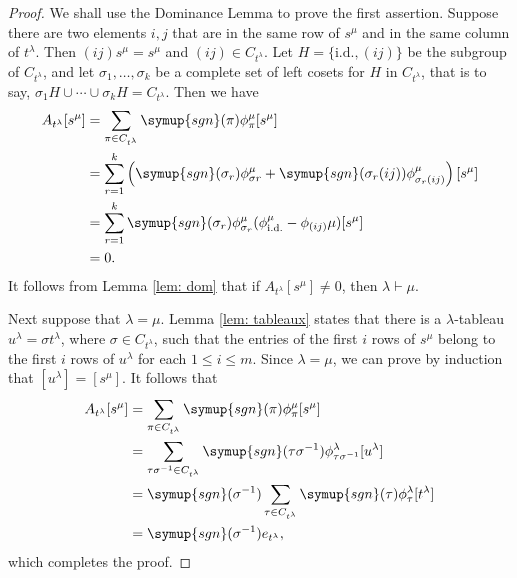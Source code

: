 \documentclass{assignment}[2019/10/15]
\newcommand{\lr}[3]{\left#1#3\right#2}
\theoremstyle{plain}
\newcommand{\sgn}{\mathop{}\!\symup{sgn}}
\newcommand{\id}{\text{i.d.}}
\begin{document}
    \begin{proof}
        We shall use the Dominance Lemma to prove the first assertion. Suppose there are two elements $i, j$ that are in the same row of $s^\mu$ and in the same column of $t^\lambda$. Then $(i j)s^\mu = s^\mu$ and $(i j)\in C_{t^\lambda}$. Let $H=\{\id, (i j)\}$ be the subgroup of $C_{t^\lambda}$, and let $\sigma_1, \dotsc, \sigma_k$ be a complete set of left cosets for $H$ in $C_{t^\lambda}$, that is to say, $\sigma_1H\cup\dotsb \cup \sigma_kH = C_{t^\lambda}$. Then we have
        \begin{equation}
            \begin{aligned}
                A_{t^\lambda}[s^\mu] &= \sum_{\pi\in C_{t^\lambda}}\sgn(\pi)\phi_\pi^\mu[s^\mu]\\
                &= \sum_{r=1}^k \lr(){\sgn(\sigma_r)\phi_{\sigma r}^\mu + \sgn(\sigma_r(i j))\phi_{\sigma_r(i j)}^\mu}[s^\mu]\\
                &= \sum_{r=1}^k\sgn(\sigma_r)\phi_{\sigma_r}^\mu(\phi_\id^\mu-\phi_{(i j)}\mu)[s^\mu]\\
                &= 0.
            \end{aligned}
        \end{equation}
        It follows from Lemma \ref{lem: dom} that if $A_{t^\lambda}[s^\mu]\neq 0$, then $\lambda\vdash\mu$.

        Next suppose that $\lambda=\mu$. Lemma \ref{lem: tableaux} states that there is a $\lambda$-tableau $u^\lambda = \sigma t^\lambda$, where $\sigma\in C_{t^\lambda}$, such that the entries of the first $i$ rows of $s^\mu$ belong to the first $i$ rows of $u^\lambda$ for each $1\leq i\leq m$. Since $\lambda=\mu$, we can prove by induction that $[u^\lambda]=[s^\mu]$. It follows that
        \begin{equation}
            \begin{aligned}
                A_{t^\lambda}[s^\mu]
                &= \sum_{\pi\in C_{t^\lambda}}\sgn(\pi)\phi_\pi^\mu[s^\mu]\\
                &= \sum_{\tau\sigma^{-1}\in C_{t^\lambda}}\sgn(\tau\sigma^{-1})\phi_{\tau\sigma^{-1}}^\lambda[u^\lambda]\\
                &= \sgn(\sigma^{-1})\sum_{\tau\in C_{t^\lambda}}\sgn(\tau)\phi_\tau^\lambda[t^\lambda]\\
                &= \sgn(\sigma^{-1})e_{t^\lambda},
            \end{aligned}
        \end{equation}
        which completes the proof.
    \end{proof}
\end{document}
